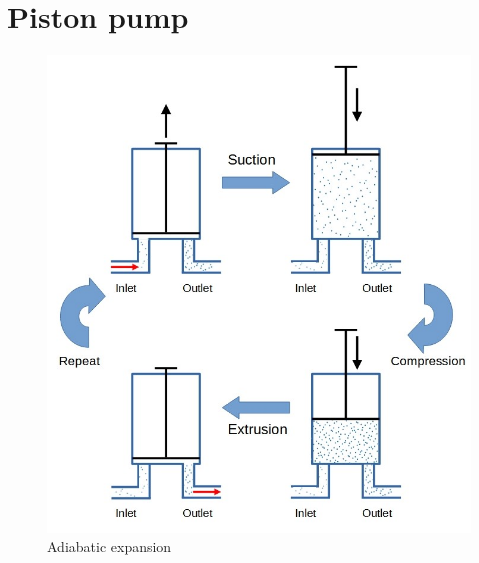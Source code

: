 \documentclass[12pt,a4paper]{article}
\numberwithin{equation}{section}
\begin{document}
\section{Piston pump}
\begin{figure}[h]
\centering
\includegraphics[scale=0.5]{image3}
\caption{Adiabatic expansion}\label{fig:piston}
\end{figure}
\end{document}
